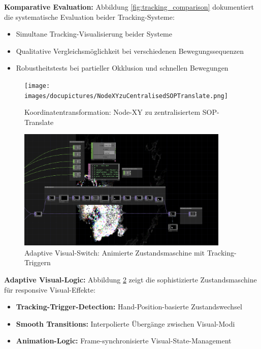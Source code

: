 \textbf{Komparative Evaluation:}
Abbildung \ref{fig:tracking_comparison} dokumentiert die systematische Evaluation beider Tracking-Systeme:
\begin{itemize}
    \item Simultane Tracking-Visualisierung beider Systeme
    \item Qualitative Vergleichsmöglichkeit bei verschiedenen Bewegungssequenzen
    \item Robustheitstests bei partieller Okklusion und schnellen Bewegungen
\end{itemize}

\begin{figure}[H]
    \centering
    \texttt{[image: images/docupictures/NodeXYzuCentralisedSOPTranslate.png]}
    \caption{Koordinatentransformation: Node-XY zu zentralisiertem SOP-Translate}
    \label{fig:coordinate_transformation}
\end{figure}

\begin{figure}[H]
    \centering
    \includegraphics[width=0.9\textwidth]{images/docupictures/NoisyBlob_animatedSwitchzwischenBlitzUndNichtBlitzBeiTrackingTrigger.png}
    \caption{Adaptive Visual-Switch: Animierte Zustandsmaschine mit Tracking-Triggern}
    \label{fig:animated_switch}
\end{figure}

\textbf{Adaptive Visual-Logic:}
Abbildung \ref{fig:animated_switch} zeigt die sophistizierte Zustandsmaschine für responsive Visual-Effekte:
\begin{itemize}
    \item \textbf{Tracking-Trigger-Detection:} Hand-Position-basierte Zustandswechsel
    \item \textbf{Smooth Transitions:} Interpolierte Übergänge zwischen Visual-Modi
    \item \textbf{Animation-Logic:} Frame-synchronisierte Visual-State-Management
\end{itemize}

